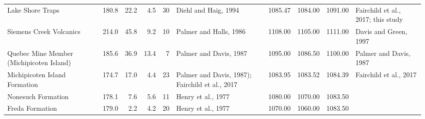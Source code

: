 \begin{tabular}{lrrrrlrrrl}
 Lake Shore Traps &  180.8 &  22.2 &  4.5 &  30 &  Diehl and Haig, 1994 &  1085.47 &  1084.00 &  1091.00 &  Fairchild et al., 2017; this study \\
 Siemens Creek Volcanics &  214.0 &  45.8 &  9.2 &  10 &  Palmer and Halls, 1986 &  1108.00 &  1105.00 &  1111.00 &  Davis and Green, 1997 \\
 Quebec Mine Member (Michipicoten Island) &  185.6 &  36.9 &  13.4 &  7 &  Palmer and Davis, 1987 &  1095.00 &  1086.50 &  1100.00 &  Palmer and Davis, 1987 \\
 Michipicoten Island Formation &  174.7 &  17.0 &  4.4 &  23 &  Palmer and Davis, 1987); Fairchild et al., 2017 &  1083.95 &  1083.52 &  1084.39 &  Fairchild et al., 2017 \\
 Nonesuch Formation &  178.1 &  7.6 &  5.6 &  11 &  Henry et al., 1977 &  1080.00 &  1070.00 &  1083.50 &   \\
 Freda Formation &  179.0 &  2.2 &  4.2 &  20 &  Henry et al., 1977 &  1070.00 &  1060.00 &  1083.50 &   \\
\bottomrule
\end{tabular}
